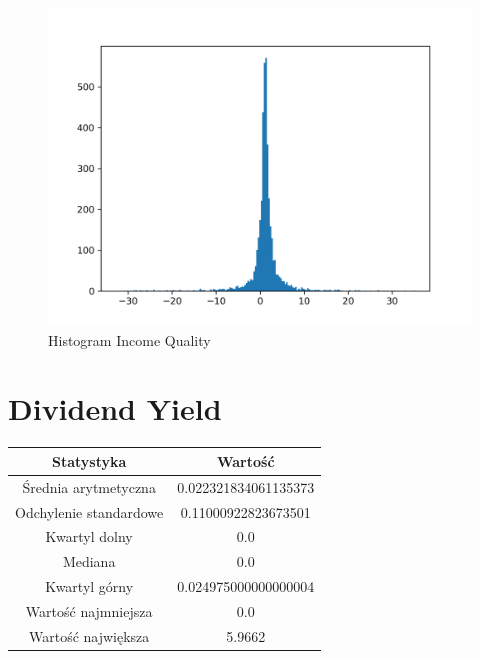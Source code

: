 \documentclass{article}
\begin{document}
\begin{figure}[h!]
    \includegraphics[width=\linewidth]{variables/Income Quality.png}
    \caption{Histogram Income Quality }
\end{figure}\section{ Dividend Yield }

\begin{center}
    \begin{tabular}{|c | c|} 
    \hline
    Statystyka & Wartość \\
    \hline\hline
    Średnia arytmetyczna & 0.022321834061135373 \\ 
    \hline
    Odchylenie standardowe & 0.11000922823673501 \\
    \hline
    Kwartyl dolny & 0.0 \\
    \hline
    Mediana & 0.0 \\
    \hline
    Kwartyl górny & 0.024975000000000004 \\
    \hline
    Wartość najmniejsza & 0.0 \\
    \hline
    Wartość największa & 5.9662 \\
    \hline
   \end{tabular}
\end{center}
\end{document}
